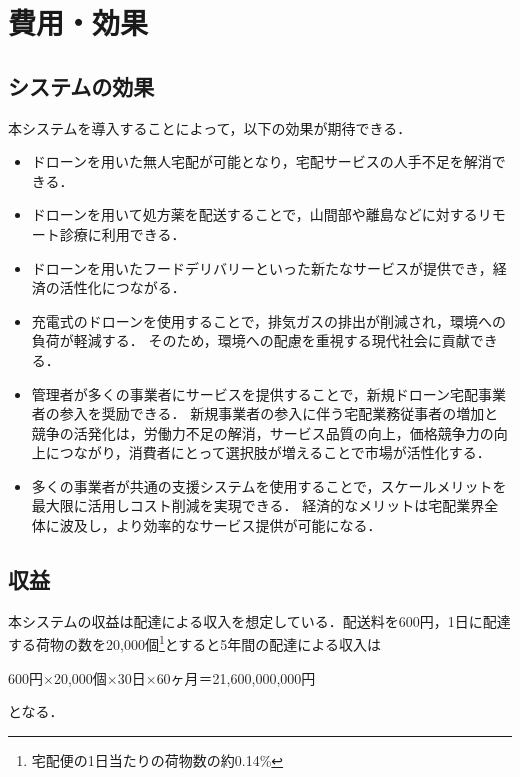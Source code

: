 \documentclass[a4paper, titlepage]{jsarticle}
\begin{document}
\section{費用・効果}
\subsection{システムの効果}
本システムを導入することによって，以下の効果が期待できる．
\begin{itemize}
  \item ドローンを用いた無人宅配が可能となり，宅配サービスの人手不足を解消できる．
  \item ドローンを用いて処方薬を配送することで，山間部や離島などに対するリモート診療に利用できる．
  \item ドローンを用いたフードデリバリーといった新たなサービスが提供でき，経済の活性化につながる．
  \item 充電式のドローンを使用することで，排気ガスの排出が削減され，環境への負荷が軽減する．
        そのため，環境への配慮を重視する現代社会に貢献できる．
  \item 管理者が多くの事業者にサービスを提供することで，新規ドローン宅配事業者の参入を奨励できる．
        新規事業者の参入に伴う宅配業務従事者の増加と競争の活発化は，労働力不足の解消，サービス品質の向上，価格競争力の向上につながり，消費者にとって選択肢が増えることで市場が活性化する．
  \item 多くの事業者が共通の支援システムを使用することで，スケールメリットを最大限に活用しコスト削減を実現できる．
        経済的なメリットは宅配業界全体に波及し，より効率的なサービス提供が可能になる．
\end{itemize}

\subsection{収益}
本システムの収益は配達による収入を想定している．配送料を600円，1日に配達する荷物の数を20,000個\footnote{\label{fot:baggage}宅配便の1日当たりの荷物数の約0.14\%}とすると5年間の配達による収入は

\begin{center}
  600円$\times$20,000個$\times$30日$\times$60ヶ月＝21,600,000,000円
\end{center}
となる．
\end{document}
